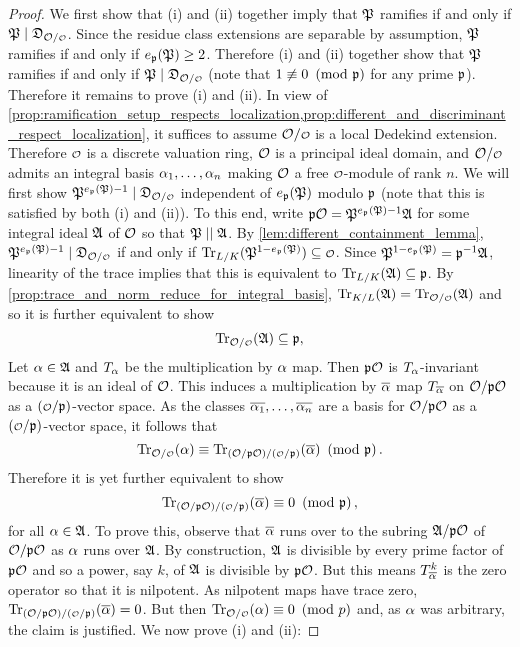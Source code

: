     \begin{proof}
      We first show that (i) and (ii) together imply that $\mathfrak{P}$ ramifies if and only if $\mf{P} \mid \mf{D}_{\mc{O}/\smc{O}}$. Since the residue class extensions are separable by assumption, $\mathfrak{P}$ ramifies if and only if $e_{\mathfrak{p}}(\mathfrak{P}) \ge 2$. Therefore (i) and (ii) together show that $\mathfrak{P}$ ramifies if and only if $\mf{P} \mid \mf{D}_{\mc{O}/\smc{O}}$ (note that $1 \not\equiv 0 \ \left(\text{mod }\mathfrak{p}\right)$ for any prime $\mathfrak{p}$). Therefore it remains to prove (i) and (ii). In view of \cref{prop:ramification_setup_respects_localization,prop:different_and_discriminant_respect_localization}, it suffices to assume $\mc{O}/\smc{O}$ is a local Dedekind extension. Therefore $\smc{O}$ is a discrete valuation ring, $\mathcal{O}$ is a principal ideal domain, and $\mc{O}/\smc{O}$ admits an integral basis $\alpha_{1},\ldots,\alpha_{n}$ making $\mathcal{O}$ a free $\smc{O}$-module of rank $n$. We will first show $\mf{P}^{e_{\mf{p}}(\mf{P})-1} \mid \mf{D}_{\mc{O}/\smc{O}}$ independent of $e_{\mathfrak{p}}(\mathfrak{P})$ modulo $\mathfrak{p}$ (note that this is satisfied by both (i) and (ii)). To this end, write $\mathfrak{p}\mathcal{O} = \mathfrak{P}^{e_{\mathfrak{p}}(\mathfrak{P})-1}\mathfrak{A}$ for some integral ideal $\mathfrak{A}$ of $\mathcal{O}$ so that $\mathfrak{P} \mid\mid \mathfrak{A}$. By \cref{lem:different_containment_lemma}, $\mf{P}^{e_{\mf{p}}(\mf{P})-1} \mid \mf{D}_{\mc{O}/\smc{O}}$ if and only if $\Trace_{L/K}(\mf{P}^{1-e_{\mf{p}}(\mf{P})}) \subseteq \smc{O}$. Since $\mathfrak{P}^{1-e_{\mathfrak{p}}(\mathfrak{P})} = \mathfrak{p}^{-1}\mathfrak{A}$, linearity of the trace implies that this is equivalent to $\operatorname{\mathrm{Tr}}_{L/K}(\mathfrak{A}) \subseteq \mathfrak{p}$. By \cref{prop:trace_and_norm_reduce_for_integral_basis}, $\Trace_{K/L}(\mf{A}) = \Trace_{\mc{O}/\smc{O}}(\mf{A})$ and so it is further equivalent to show
      \[
        \Trace_{\mc{O}/\smc{O}}(\mf{A}) \subseteq \mf{p},
      \]
      Let $\alpha \in \mathfrak{A}$ and $T_{\alpha}$ be the multiplication by $\alpha$ map. Then $\mathfrak{p}\mathcal{O}$ is $T_{\alpha}$-invariant because it is an ideal of $\mathcal{O}$. This induces a multiplication by $\overline{\alpha}$ map $T_{\overline{\alpha}}$ on $\mathcal{O}/\mathfrak{p}\mathcal{O}$ as a $(\smc{O}/\mf{p})$-vector space. As the classes $\overline{\alpha_{1}},\ldots,\overline{\alpha_{n}}$ are a basis for $\mathcal{O}/\mathfrak{p}\mathcal{O}$ as a $(\smc{O}/\mf{p})$-vector space, it follows that
      \[
        \Trace_{\mc{O}/\smc{O}}(\a) \equiv \Trace_{(\mc{O}/\mf{p}\mc{O})/(\smc{O}/\mf{p})}(\conj{\a}) \tmod{\mf{p}}.
      \]
      Therefore it is yet further equivalent to show
      \[
        \Trace_{(\mc{O}/\mf{p}\mc{O})/(\smc{O}/\mf{p})}(\conj{\a}) \equiv 0 \tmod{\mf{p}},
      \]
      for all $\alpha \in \mathfrak{A}$. To prove this, observe that $\overline{\alpha}$ runs over to the subring $\mathfrak{A}/\mathfrak{p}\mathcal{O}$ of $\mathcal{O}/\mathfrak{p}\mathcal{O}$ as $\alpha$ runs over $\mathfrak{A}$. By construction, $\mathfrak{A}$ is divisible by every prime factor of $\mathfrak{p}\mathcal{O}$ and so a power, say $k$, of $\mathfrak{A}$ is divisible by $\mathfrak{p}\mathcal{O}$. But this means $T_{\overline{\alpha}}^{k}$ is the zero operator so that it is nilpotent. As nilpotent maps have trace zero, $\Trace_{(\mc{O}/\mf{p}\mc{O})/(\smc{O}/\mf{p})}(\conj{\a}) = 0$. But then $\Trace_{\mc{O}/\smc{O}}(\a) \equiv 0 \tmod{p}$ and, as $\alpha$ was arbitrary, the claim is justified. We now prove (i) and (ii):

\end{proof}
